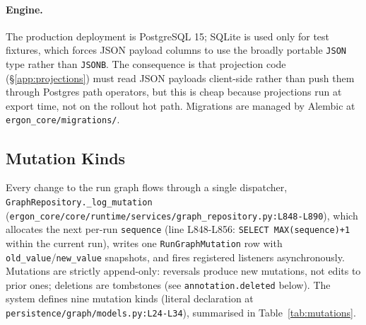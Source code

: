 \documentclass{article}
\begin{document}
\paragraph{Engine.} The production deployment is PostgreSQL
15; SQLite is used only for test fixtures, which forces JSON
payload columns to use the broadly portable \texttt{JSON} type
rather than \texttt{JSONB}. The consequence is that projection
code (\S\ref{app:projections}) must read JSON payloads
client-side rather than push them through Postgres path
operators, but this is cheap because projections run at export
time, not on the rollout hot path. Migrations are managed by
Alembic at \texttt{ergon\_core/migrations/}.

\subsection{Mutation Kinds}
\label{app:system:mutations}

Every change to the run graph flows through a single
dispatcher, \texttt{GraphRepository.\_log\_mutation}
(\texttt{ergon\_core/core/runtime/services/}\allowbreak\texttt{graph\_repository.py:L848-L890}),
which allocates the next per-run \texttt{sequence} (line
L848-L856: \texttt{SELECT MAX(sequence)+1} within the current
run), writes one \texttt{RunGraphMutation} row with
\texttt{old\_value}/\texttt{new\_value} snapshots, and fires
registered listeners asynchronously. Mutations are strictly
append-only: reversals produce new mutations, not edits to
prior ones; deletions are tombstones (see
\texttt{annotation.deleted} below). The system defines nine
mutation kinds (literal declaration at
\texttt{persistence/graph/models.py:L24-L34}), summarised in
Table~\ref{tab:mutations}.
\end{document}
